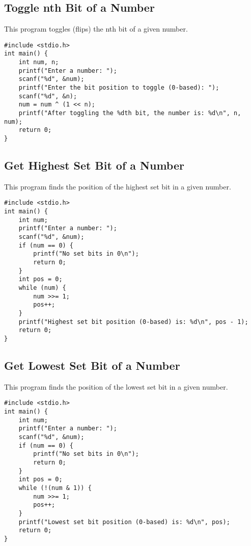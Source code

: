 \documentclass[a4paper,12pt]{article}
\begin{document}
\newpage

\subsection{Toggle nth Bit of a Number}
This program toggles (flips) the nth bit of a given number.

\begin{lstlisting}[caption={Toggle nth Bit of a Number}]
#include <stdio.h>
int main() {
    int num, n;
    printf("Enter a number: ");
    scanf("%d", &num);
    printf("Enter the bit position to toggle (0-based): ");
    scanf("%d", &n);
    num = num ^ (1 << n);
    printf("After toggling the %dth bit, the number is: %d\n", n, num);
    return 0;
}
\end{lstlisting}

\newpage

\subsection{Get Highest Set Bit of a Number}
This program finds the position of the highest set bit in a given number.

\begin{lstlisting}[caption={Get Highest Set Bit of a Number}]
#include <stdio.h>
int main() {
    int num;
    printf("Enter a number: ");
    scanf("%d", &num);
    if (num == 0) {
        printf("No set bits in 0\n");
        return 0;
    }
    int pos = 0;
    while (num) {
        num >>= 1;
        pos++;
    }
    printf("Highest set bit position (0-based) is: %d\n", pos - 1);
    return 0;
}
\end{lstlisting}

\newpage

\subsection{Get Lowest Set Bit of a Number}
This program finds the position of the lowest set bit in a given number.

\begin{lstlisting}[caption={Get Lowest Set Bit of a Number}]
#include <stdio.h>
int main() {
    int num;
    printf("Enter a number: ");
    scanf("%d", &num);
    if (num == 0) {
        printf("No set bits in 0\n");
        return 0;
    }
    int pos = 0;
    while (!(num & 1)) {
        num >>= 1;
        pos++;
    }
    printf("Lowest set bit position (0-based) is: %d\n", pos);
    return 0;
}
\end{lstlisting}
\end{document}

